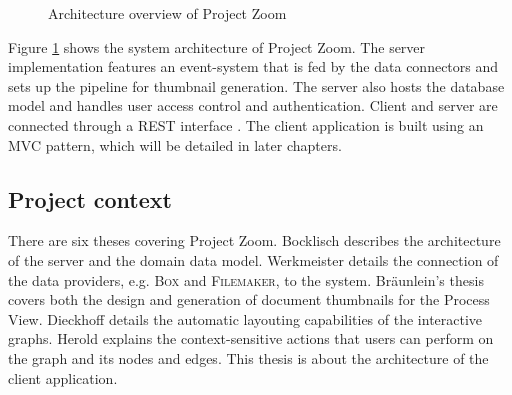 \begin{figure}
\caption{Architecture overview of Project Zoom}
\label{fig:CompleteArchitectureDiagram}
\end{figure}

Figure \ref{fig:CompleteArchitectureDiagram} shows the system architecture of Project Zoom. The server implementation features an event-system that is fed by the data connectors and sets up the pipeline for thumbnail generation. The server also hosts the database model and handles user access control and authentication. Client and server are connected through a REST interface \cite{Fielding_2000}. The client application is built using an MVC pattern, which will be detailed in later chapters. 

\subsection{Project context}
There are six theses covering Project Zoom. Bocklisch \cite{Bocklisch_2013} describes the architecture of the server and the domain data model. Werkmeister \cite{Werkmeister_2013} details the connection of the data providers, e.g. \textsc{Box} and \textsc{Filemaker}, to the system. Bräunlein's thesis \cite{Braeunlein_2013} covers both the design and generation of document thumbnails for the Process View. Dieckhoff \cite{Dieckhoff_2013} details the automatic layouting capabilities of the interactive graphs. Herold \cite{Herold_2013} explains the context-sensitive actions that users can perform on the graph and its nodes and edges. This thesis is about the architecture of the client application.
